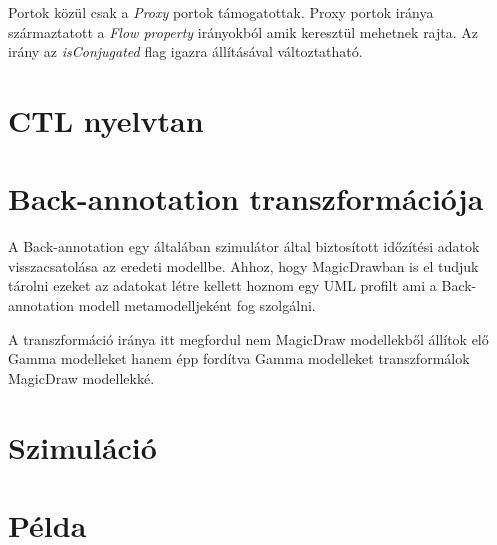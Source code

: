 Portok közül csak a \emph{Proxy} portok támogatottak. Proxy portok iránya származtatott a \emph{Flow property} irányokból amik keresztül mehetnek rajta. Az irány az \emph{isConjugated} flag igazra állításával változtatható.

\section{CTL nyelvtan}

\section{Back-annotation transzformációja}

A Back-annotation egy általában szimulátor által biztosított időzítési adatok visszacsatolása az eredeti modellbe. Ahhoz, hogy MagicDrawban is el tudjuk tárolni ezeket az adatokat létre kellett hoznom egy UML profilt ami a Back-annotation modell metamodelljeként fog szolgálni.

A transzformáció iránya itt megfordul nem MagicDraw modellekből állítok elő Gamma modelleket hanem épp fordítva Gamma modelleket transzformálok MagicDraw modellekké.



\section{Szimuláció}

\section{Példa} %